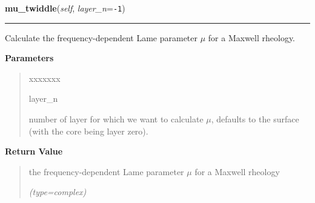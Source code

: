 \hspace{.8\funcindent}\begin{boxedminipage}{\funcwidth}

    \raggedright \textbf{mu\_twiddle}(\textit{self}, \textit{layer\_n}={\tt -1})

    \vspace{-1.5ex}

    \rule{\textwidth}{0.5\fboxrule}
\setlength{\parskip}{2ex}
    Calculate the frequency-dependent Lame parameter \(\mu\) for a Maxwell 
    rheology.

\setlength{\parskip}{1ex}
      \textbf{Parameters}
      \vspace{-1ex}

      \begin{quote}
        \begin{Ventry}{xxxxxxx}

          \item[layer\_n]

          number of layer for which we want to calculate \(\mu\), defaults 
          to the surface (with the core being layer zero).

        \end{Ventry}

      \end{quote}

      \textbf{Return Value}
    \vspace{-1ex}

      \begin{quote}
      the frequency-dependent Lame parameter \(\mu\) for a Maxwell rheology

      {\it (type=complex)}

      \end{quote}

    \end{boxedminipage}

    \label{satstress:SatStress:StressDef:lambda_twiddle}

    \vspace{0.5ex}

